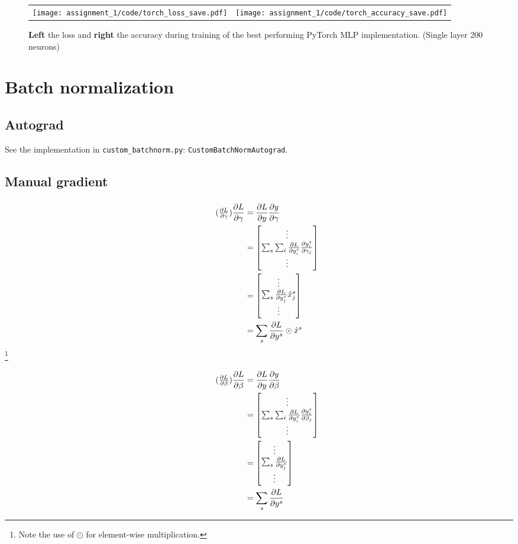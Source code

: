 \documentclass{article}
\newcommand\bM[1]{\ensuremath{\begin{bmatrix}#1\end{bmatrix}}}
\newcommand\·{\ensuremath{\cdot}}
\newcommand\…{\ensuremath{\dots}}
\newcommand{\⇔}{\ensuremath{\iff}}
\newcommand{\⇐}{\ensuremath{\impliedby}}
\newcommand{\⇒}{\ensuremath{\implies}}
\newcommand\pf[2]{\ensuremath{\frac{\partial {#1}}{\partial {#2}}}}
\newcommand\1{\ensuremath{\mathds{1}}}
\newcommand\ℝ{\ensuremath{\mathds{R}}}
\begin{document}
\begin{figure}
  \begin{tabularx}{\linewidth}{XX}
    \texttt{[image: assignment\_1/code/torch\_loss\_save.pdf]} &
    \texttt{[image: assignment\_1/code/torch\_accuracy\_save.pdf]}
  \end{tabularx}
  \caption{\textbf{Left} the loss and \textbf{right} the accuracy during training of the best performing PyTorch MLP implementation. (Single layer 200 neurons)}
  \label{fig:pytorch_mlp}
\end{figure}

\section{Batch normalization}
\subsection{Autograd}
See the implementation in \texttt{custom\_batchnorm.py}: \texttt{CustomBatchNormAutograd}.

\subsection{Manual gradient}
\subsubsection{}
\begin{align*}
  \tag{$\pf{L}{\gamma}$}
  \pf{L}{\gamma}
  &= \pf{L}{y} \pf{y}{\gamma}\\
  &= \bM{\vdots\\ \sum_s\sum_i \pf{L}{y_i^s} \pf{y_i^s}{\gamma_j}\\\vdots}\\
  &= \bM{\vdots\\ \sum_s\pf{L}{y_j^s} \hat{x}_j^s\\\vdots}\\
  &= \sum_s \pf{L}{y^s}\odot\hat{x}^s
\end{align*}
\footnote{Note the use of $\odot$ for element-wise multiplication.}

\begin{align*}
  \tag{$\pf{L}{\beta}$}
  \pf{L}{\beta}
  &= \pf{L}{y} \pf{y}{\beta}\\
  &= \bM{\vdots\\ \sum_s\sum_i \pf{L}{y_i^s} \pf{y_i^s}{\beta_j}\\ \vdots}\\
  &= \bM{\vdots\\ \sum_s\pf{L}{y_j^s} \\\vdots}\\
  &= \sum_s\pf{L}{y^s}
\end{align*}
\end{document}
